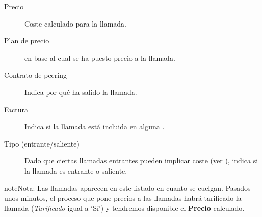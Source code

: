 \documentclass[letterpaper,10pt,spanish]{sphinxmanual}
\begin{document}
\begin{description}
\item[{Precio}] \leavevmode{}\label{billing_and_invoices/billable_calls:term-precio}
Coste calculado para la llamada.

\item[{Plan de precio}] \leavevmode{}\label{billing_and_invoices/billable_calls:term-plan-de-precio}
{\hyperref[external_outgoing_calls/noplan_nocall:price\string-plan]{}} en base al cual se ha puesto precio a la llamada.

\item[{Contrato de peering}] \leavevmode{}\label{billing_and_invoices/billable_calls:term-contrato-de-peering}
Indica por qué {\hyperref[external_incoming_calls/peering_contracts:peering\string-contracts]{}} ha salido la llamada.

\item[{Factura}] \leavevmode{}\label{billing_and_invoices/billable_calls:term-factura}
Indica si la llamada está incluida en alguna {\hyperref[billing_and_invoices/invoices:invoices]{}}.

\item[{Tipo (entrante/saliente)}] \leavevmode{}\label{billing_and_invoices/billable_calls:term-tipo-entrante-saliente}
Dado que ciertas llamadas entrantes pueden implicar coste (ver {\hyperref[external_incoming_calls/configure_ddi:bill\string-inbound]{}}), indica si la llamada es entrante o saliente.

\end{description}

\begin{notice}{note}{Nota:}
Las llamadas aparecen en este listado en cuanto se cuelgan. Pasados unos minutos, el proceso que pone precios a las llamadas habrá tarificado la llamada (\emph{Tarificado} igual a `Sí') y tendremos disponible el \textbf{Precio} calculado.
\end{notice}
\end{document}
